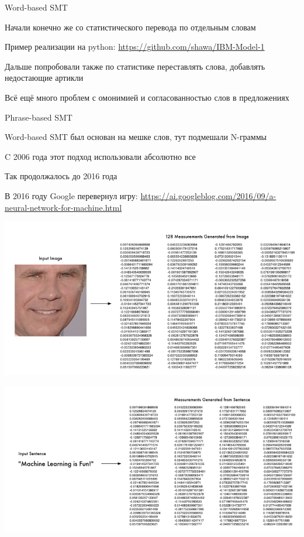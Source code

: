 \documentclass[notes,12pt, aspectratio=169]{beamer}
\newenvironment{wideitemize}{\itemize\addtolength{\itemsep}{10pt}}{\enditemize}
\begin{document}
\begin{frame} {Word-based SMT} 
\begin{wideitemize}
	\item   Начали конечно же со статистического перевода по отдельным словам
	\item   Пример реализации на python: {\color{blue} \url{https://github.com/shawa/IBM-Model-1}}
	\item   Дальше попробовали также по статистике переставлять слова, добавлять недостающие артикли
	\item  Всё ещё много проблем с омонимией и согласованностью слов в предложениях
\end{wideitemize}
\end{frame}

\begin{frame} {Phrase-based SMT} 
\begin{wideitemize}
	\item   Word-based SMT был основан на мешке слов, тут подмешали N-граммы 
	\item   C 2006 года этот подход использовали абсолютно все
	\item   Так продолжалось до 2016 года
	\item  В 2016 году Google перевернул игру: {\color{blue} \url{https://ai.googleblog.com/2016/09/a-neural-network-for-machine.html}}
\end{wideitemize}
\end{frame}

\begin{frame}
\begin{center}
	\includegraphics[width=.8\linewidth]{img_vec.jpg}
\end{center}
\end{frame}

\begin{frame}
\begin{center}
	\includegraphics[width=.8\linewidth]{word_vec.jpg}
\end{center}
\end{frame}
\end{document}
